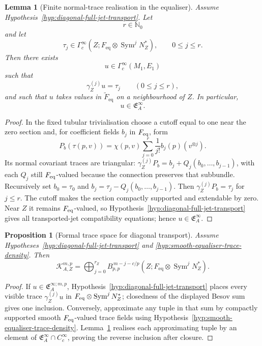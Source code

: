 \documentclass[11pt]{article}
\theoremstyle{plain}
\newtheorem{proposition}[theorem]{Proposition}
\newtheorem{lemma}[theorem]{Lemma}
\theoremstyle{definition}
\begin{document}
\begin{lemma}[Finite normal-trace realisation in the equaliser]
\label{lem:equaliser-normal-trace-realisation}
Assume
Hypothesis~\ref{hyp:diagonal-full-jet-transport}. Let
\[
  r\in\mathbb N_0
\]
and let
\[
  \tau_j
  \in
  \Gamma_c^\infty
  \left(
    Z;
    F_{\mathrm{eq}}
    \otimes
    \operatorname{Sym}^jN_Z^*
  \right),
  \qquad
  0\leq j\leq r.
\]
Then there exists
\[
  u\in\Gamma_c^\infty(M_1,E_1)
\]
such that
\[
  \gamma_Z^{(j)}u=\tau_j
  \qquad
  (0\leq j\leq r),
\]
and such that \(u\) takes values in
\(\widetilde F_{\mathrm{eq}}\) on a neighbourhood of \(Z\). In
particular,
\[
  u\in\mathfrak E_A^\infty.
\]
\end{lemma}

\begin{proof}
In the fixed tubular trivialisation choose a cutoff equal to one near the zero section and, for coefficient fields \(b_j\) in \(F_{\rm eq}\), form
\[
 P_b(\tau(p,v))=\chi(p,v)\sum_{j=0}^r\frac1{j!}b_j(p)(v^{\otimes j}).
\]
Its normal covariant traces are triangular:
\(\gamma_Z^{(j)}P_b=b_j+Q_j(b_0,\ldots,b_{j-1})\), with each \(Q_j\) still \(F_{\rm eq}\)-valued because the connection preserves that subbundle. Recursively set \(b_0=\tau_0\) and \(b_j=\tau_j-Q_j(b_0,\ldots,b_{j-1})\). Then \(\gamma_Z^{(j)}P_b=\tau_j\) for \(j\le r\). The cutoff makes the section compactly supported and extendable by zero. Near \(Z\) it remains \(F_{\rm eq}\)-valued, so Hypothesis~\ref{hyp:diagonal-full-jet-transport} gives all transported-jet compatibility equations; hence \(u\in\mathfrak E_A^\infty\).
\end{proof}

\begin{proposition}[Formal trace space for diagonal transport]
\label{prop:constant-transport-traces}
Assume
Hypotheses~\ref{hyp:diagonal-full-jet-transport}
and \ref{hyp:smooth-equaliser-trace-density}. Then
\[
  \boxed{
  \mathcal K_{A,Z}^{m,p}
  =
  \bigoplus_{j=0}^{r_Z}
  B_{p,p}^{\,m-j-c/p}
  \left(
    Z;
    F_{\mathrm{eq}}
    \otimes
    \operatorname{Sym}^jN_Z^*
  \right).
  }
\]
\end{proposition}

\begin{proof}
If \(u\in\mathfrak E_A^{\infty;m,p}\), Hypothesis~\ref{hyp:diagonal-full-jet-transport} places every visible trace \(\gamma_Z^{(j)}u\) in \(F_{\rm eq}\otimes\operatorname{Sym}^jN_Z^*\); closedness of the displayed Besov sum gives one inclusion. Conversely, approximate any tuple in that sum by compactly supported smooth \(F_{\rm eq}\)-valued trace fields using Hypothesis~\ref{hyp:smooth-equaliser-trace-density}. Lemma~\ref{lem:equaliser-normal-trace-realisation} realises each approximating tuple by an element of \(\mathfrak E_A^\infty\cap C_c^\infty\), proving the reverse inclusion after closure.
\end{proof}
\end{document}
